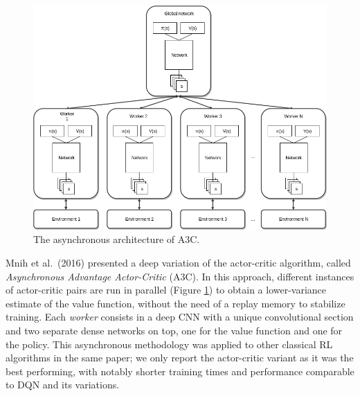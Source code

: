 %
%
\begin{figure}
\includegraphics[width=\textwidth]{pictures/a3c}
\centering
\caption[The asynchronous architecture of A3C]{The asynchronous architecture of A3C.}
\label{f:a3c}
\end{figure}
%
Mnih et al.\ (2016) \cite{mnih2016asynchronous} presented a deep variation of 
the actor-critic algorithm, called \textit{Asynchronous Advantage Actor-Critic} 
(A3C). In this approach, different instances of actor-critic pairs are run in 
parallel (Figure \ref{f:a3c}) to obtain a lower-variance estimate of the value 
function, without the need of a replay memory to stabilize training. 
Each \textit{worker} consists in a deep CNN with a unique convolutional section 
and two separate dense networks on top, one for the value function and one for 
the policy. 
This asynchronous methodology was applied to other classical RL algorithms in 
the same paper; we only report the actor-critic variant as it was the best 
performing, with notably shorter training times and performance comparable 
to DQN and its variations.

